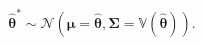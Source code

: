 \begin{equation}
	\label{eq:mc}
	\hat{\boldsymbol{\theta}}^{\ast}
	\sim
	\mathcal{N}
	\left(
	\boldsymbol{\mu} = \hat{\boldsymbol{\theta}},
	\boldsymbol{\Sigma} = \mathbb{V} \left( \hat{\boldsymbol{\theta}} \right)
	\right) .
\end{equation}

